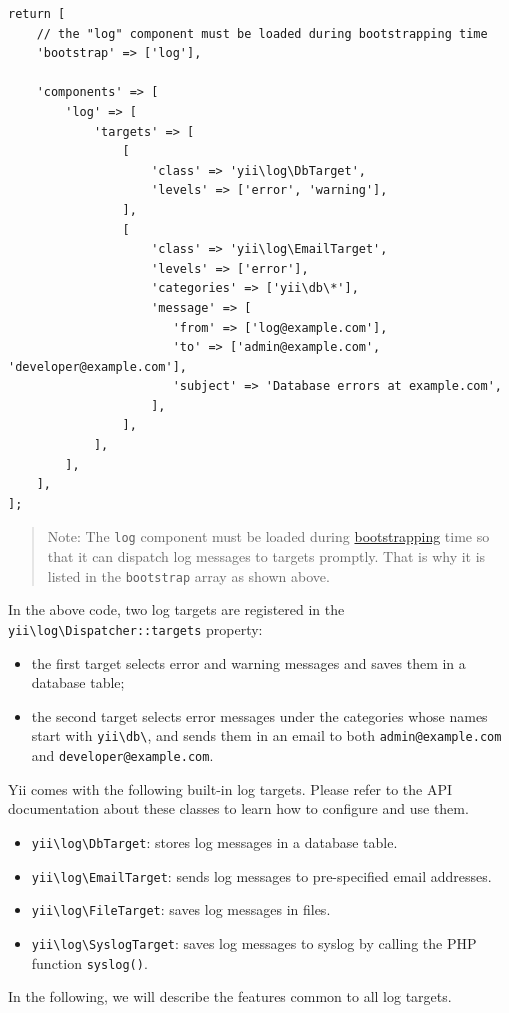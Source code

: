 \lstset{language=php}\begin{lstlisting}
return [
    // the "log" component must be loaded during bootstrapping time
    'bootstrap' => ['log'],
    
    'components' => [
        'log' => [
            'targets' => [
                [
                    'class' => 'yii\log\DbTarget',
                    'levels' => ['error', 'warning'],
                ],
                [
                    'class' => 'yii\log\EmailTarget',
                    'levels' => ['error'],
                    'categories' => ['yii\db\*'],
                    'message' => [
                       'from' => ['log@example.com'],
                       'to' => ['admin@example.com', 'developer@example.com'],
                       'subject' => 'Database errors at example.com',
                    ],
                ],
            ],
        ],
    ],
];
\end{lstlisting}
\begin{quote}Note: The \lstinline|log| component must be loaded during \hyperref[runtime-bootstrapping.md]{bootstrapping} time so that
it can dispatch log messages to targets promptly. That is why it is listed in the \lstinline|bootstrap| array as shown above.

\end{quote}
In the above code, two log targets are registered in the \texttt{yii{\allowbreak{}\textbackslash}log{\allowbreak{}\textbackslash}Dispatcher\allowbreak{}::\allowbreak{}targets} property: 

\begin{itemize}
\item the first target selects error and warning messages and saves them in a database table;
\item the second target selects error messages under the categories whose names start with \lstinline|yii\db\|, and sends
them in an email to both \lstinline|admin@example.com| and \lstinline|developer@example.com|.
\end{itemize}
Yii comes with the following built-in log targets. Please refer to the API documentation about these classes to 
learn how to configure and use them. 

\begin{itemize}
\item \texttt{yii{\allowbreak{}\textbackslash}log{\allowbreak{}\textbackslash}DbTarget}: stores log messages in a database table.
\item \texttt{yii{\allowbreak{}\textbackslash}log{\allowbreak{}\textbackslash}EmailTarget}: sends log messages to pre-specified email addresses.
\item \texttt{yii{\allowbreak{}\textbackslash}log{\allowbreak{}\textbackslash}FileTarget}: saves log messages in files.
\item \texttt{yii{\allowbreak{}\textbackslash}log{\allowbreak{}\textbackslash}SyslogTarget}: saves log messages to syslog by calling the PHP function \lstinline|syslog()|.
\end{itemize}
In the following, we will describe the features common to all log targets.


